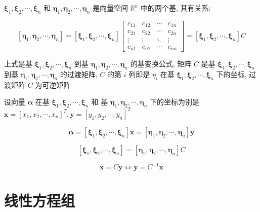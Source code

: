 \begin{definition}[基变换]
	$\boldsymbol{\xi}_{1},\boldsymbol{\xi}_{2},\cdots,\boldsymbol{\xi}_{n}$ 和 $\boldsymbol{\eta}_{1},\boldsymbol{\eta}_{2},\cdots,\boldsymbol{\eta}_{n}$ 是向量空间 $\mathbb{R}^{n}$ 中的两个基, 其有关系:  
	
	$$[\boldsymbol{\eta}_{1},\boldsymbol{\eta}_{2},\cdots,\boldsymbol{\eta}_{n}] = 
	[\boldsymbol{\xi}_{1},\boldsymbol{\xi}_{2},\cdots,\boldsymbol{\xi}_{n}]
	\begin{bmatrix}
		c_{11} & c_{12} & \cdots & c_{1n}\\
		c_{21} & c_{22} & \cdots & c_{2n}\\
		\vdots & \vdots & \ddots & \vdots\\
		c_{n1} & c_{n2} & \cdots & c_{nn}
	\end{bmatrix} = [\boldsymbol{\xi}_{1},\boldsymbol{\xi}_{2},\cdots,\boldsymbol{\xi}_{n}]C$$
	
	上式是基 $\boldsymbol{\xi}_{1},\boldsymbol{\xi}_{2},\cdots,\boldsymbol{\xi}_{n}$ 到基 $\boldsymbol{\eta}_{1},\boldsymbol{\eta}_{2},\cdots,\boldsymbol{\eta}_{n}$ 的基变换公式,
	矩阵 $C$ 是基 $\boldsymbol{\xi}_{1},\boldsymbol{\xi}_{2},\cdots,\boldsymbol{\xi}_{n}$ 到基 $\boldsymbol{\eta}_{1},\boldsymbol{\eta}_{2},\cdots,\boldsymbol{\eta}_{n}$ 的过渡矩阵,
	$C$ 的第 $i$ 列即是 $\eta_{i}$ 在基 $\boldsymbol{\xi}_{1},\boldsymbol{\xi}_{2},\cdots,\boldsymbol{\xi}_{n}$ 下的坐标, 过渡矩阵 $C$ 为可逆矩阵
\end{definition}
\begin{definition}[坐标变换]
	设向量 $\boldsymbol{\alpha}$ 在基 $\boldsymbol{\xi}_{1},\boldsymbol{\xi}_{2},\cdots,\boldsymbol{\xi}_{n}$ 和
	基 $\boldsymbol{\eta}_{1},\boldsymbol{\eta}_{2},\cdots,\boldsymbol{\eta}_{n}$ 下的坐标为别是 $\mathbf{x}=[x_{1},x_{2},\cdots,x_{n}]^{T},\mathbf{y}=[y_{1},y_{2},\cdots,y_{n}]^{T}$

	$$\boldsymbol{\alpha}=[\boldsymbol{\xi}_{1},\boldsymbol{\xi}_{2},\cdots,\boldsymbol{\xi}_{n}]\mathbf{x} = [\boldsymbol{\eta}_{1},\boldsymbol{\eta}_{2},\cdots,\boldsymbol{\eta}_{n}]\mathbf{y}$$

	$$[\boldsymbol{\xi}_{1},\boldsymbol{\xi}_{2},\cdots,\boldsymbol{\xi}_{n}] = [\boldsymbol{\eta}_{1},\boldsymbol{\eta}_{2},\cdots,\boldsymbol{\eta}_{n}]C$$
	
	$$\mathbf{x} = C\mathbf{y} \Leftrightarrow \mathbf{y} = C^{-1}\mathbf{x}$$
\end{definition}



\chapter{线性方程组}
